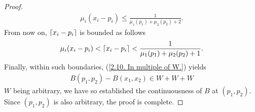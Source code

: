 \begin{proof}
\begin{align}
  \mu_i(x_i -p_i) \leq \frac{1}{\mu_1(p_1) + \mu_2(p_2) + 2}. %
  \end{align}
%
From now on, $\lceil x_i - p_i \rceil$ is bounded as follows  %
%
  \begin{align}
    \mu_i(x_i - p_i)< \lceil x_i - p_i \rceil < \frac{1}{\mu_1(p_1) + \mu_2(p_2) + 1}.
  \end{align}
%
Finally, within such boundaries, (\ref{2.10. In multiple of W.}) yields %
%
  \begin{align}
    B(p_1, p_2) - B(x_1, x_2) \in W + W + W 
  \end{align}
%
$W$ being arbitrary, %
we have so established the continuousness of $B$ at $(p_1, p_2)$. %
Since $(p_1, p_2)$ is also arbitrary, the proof is complete.
\end{proof}
%
